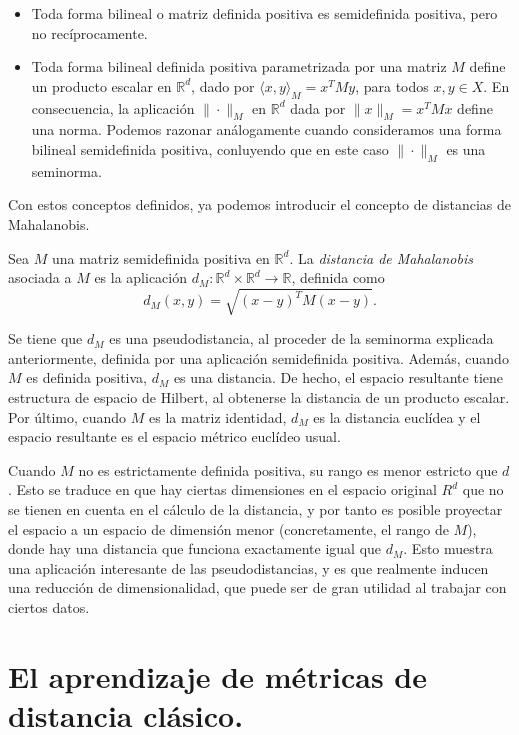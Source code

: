 \begin{definicion}
\begin{itemize}
        \item Toda forma bilineal o matriz definida positiva es semidefinida positiva, pero no recíprocamente.

        \item Toda forma bilineal definida positiva parametrizada por una matriz $M$ define un producto escalar en $\mathbb{R}^d$, dado por $\langle x, y \rangle_M = x^TMy$, para todos $x, y \in X$. En consecuencia, la aplicación $\|\cdot\|_M$ en $\mathbb{R}^d$ dada por $\|x\|_M = x^TMx$ define una norma. Podemos razonar análogamente cuando consideramos una forma bilineal semidefinida positiva, conluyendo que en este caso $\|\cdot\|_M$ es una seminorma.
        
    \end{itemize}
\end{definicion}

Con estos conceptos definidos, ya podemos introducir el concepto de distancias de Mahalanobis.

\begin{definicion}
    Sea $M$ una matriz semidefinida positiva en $\mathbb{R}^d$. La \emph{distancia de Mahalanobis} asociada a $M$ es la aplicación $d_M\colon \mathbb{R}^d \times \mathbb{R}^d \to \mathbb{R}$, definida como
    \[d_M(x,y) = \sqrt{(x-y)^TM(x-y)}.\]
\end{definicion}

Se tiene que $d_M$ es una pseudodistancia, al proceder de la seminorma explicada anteriormente, definida por una aplicación semidefinida positiva. Además, cuando $M$ es definida positiva, $d_M$ es una distancia. De hecho, el espacio resultante tiene estructura de espacio de Hilbert, al obtenerse la distancia de un producto escalar. Por último, cuando $M$ es la matriz identidad, $d_M$ es la distancia euclídea y el espacio resultante es el espacio métrico euclídeo usual.

Cuando $M$ no es estrictamente definida positiva, su rango es menor estricto que $d$. Esto se traduce en que hay ciertas dimensiones en el espacio original $R^d$ que no se tienen en cuenta en el cálculo de la distancia, y por tanto es posible proyectar el espacio a un espacio de dimensión menor (concretamente, el rango de $M$), donde hay una distancia que funciona exactamente igual que $d_M$. Esto muestra una aplicación interesante de las pseudodistancias, y es que realmente inducen una reducción de dimensionalidad, que puede ser de gran utilidad al trabajar con ciertos datos.

\section{El aprendizaje de métricas de distancia clásico.}

